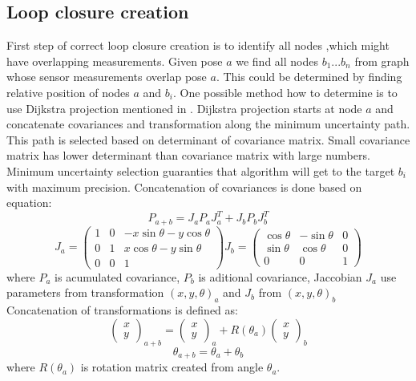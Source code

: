 \subsection {Loop closure creation}
\label{subsec:loop_closure_creation}
First step of correct loop closure creation is to identify all nodes ,which might have overlapping measurements. Given pose $a$ we find all nodes $b_{1} ... b_{n}$ from graph whose sensor measurements overlap pose $a$. This could be determined by finding relative position of nodes $a$ and $b_{i}$. One possible method how to determine is to use Dijkstra projection mentioned in \cite{Olson2009Loop}. Dijkstra projection starts at node $a$ and concatenate covariances and transformation along the minimum uncertainty path. This path is selected based on determinant of covariance matrix. Small covariance matrix has lower determinant than covariance matrix with large numbers. Minimum uncertainty selection guaranties that algorithm will get to the target $b_{i}$ with maximum precision. Concatenation of covariances is done based on equation:
\begin{equation}
P_{a+b} = J_{a} P_{a} J_{a}^{T} + J_{b} P_{b} J_{b}^{T}
\end{equation}   
\begin{equation}
J_{a} = 
\begin{pmatrix}
1 & 0 & -x\sin\theta -y\cos\theta  \\
0 & 1 & x\cos \theta  - y\sin\theta  \\
0 & 0 & 1
\end{pmatrix} 
J_{b} = 
\begin{pmatrix}
\cos\theta & -\sin\theta & 0  \\
\sin\theta & \cos\theta & 0\\
0 & 0 & 1
\end{pmatrix} 
\end{equation} 
where $P_{a}$ is acumulated covariance, $P_{b}$ is aditional covariance, Jaccobian $J_{a}$ use parameters from transformation $(x,y,\theta)_{a}$ and $J_{b}$ from  $(x,y,\theta)_{b}$ Concatenation of transformations is defined as:
\begin{equation}
\label{eq:concat_trans}
\begin{pmatrix}
x \\ y
\end{pmatrix}_{a+b}
=
\begin{pmatrix}
x \\ y
\end{pmatrix}_{a}
+ R(\theta_{a}) 
\begin{pmatrix}
x \\ y
\end{pmatrix}_{b}
\end{equation}
\begin{equation}
\theta_{a+b} = \theta_{a} + \theta_{b}
\end{equation}
where $R(\theta_{a})$ is rotation matrix created from angle $\theta_{a}$.


